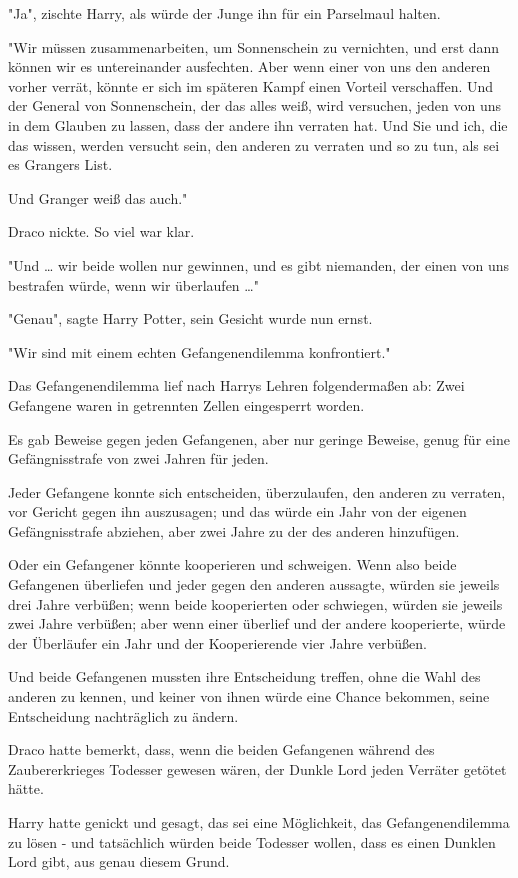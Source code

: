 {"Ja", zischte Harry, als würde der Junge ihn für ein Parselmaul halten.

"Wir müssen zusammenarbeiten, um Sonnenschein zu vernichten, und erst dann können wir es untereinander ausfechten. Aber wenn einer von uns den anderen vorher verrät, könnte er sich im späteren Kampf einen Vorteil verschaffen. Und der General von Sonnenschein, der das alles weiß, wird versuchen, jeden von uns in dem Glauben zu lassen, dass der andere ihn verraten hat. Und Sie und ich, die das wissen, werden versucht sein, den anderen zu verraten und so zu tun, als sei es Grangers List.

Und Granger weiß das auch."

Draco nickte. So viel war klar.

"Und … wir beide wollen nur gewinnen, und es gibt niemanden, der einen von uns bestrafen würde, wenn wir überlaufen …"

"Genau", sagte Harry Potter, sein Gesicht wurde nun ernst.

"Wir sind mit einem echten Gefangenendilemma konfrontiert."

Das Gefangenendilemma lief nach Harrys Lehren folgendermaßen ab: Zwei Gefangene waren in getrennten Zellen eingesperrt worden.

Es gab Beweise gegen jeden Gefangenen, aber nur geringe Beweise, genug für eine Gefängnisstrafe von zwei Jahren für jeden.

Jeder Gefangene konnte sich entscheiden, überzulaufen, den anderen zu verraten, vor Gericht gegen ihn auszusagen; und das würde ein Jahr von der eigenen Gefängnisstrafe abziehen, aber zwei Jahre zu der des anderen hinzufügen.

Oder ein Gefangener könnte kooperieren und schweigen. Wenn also beide Gefangenen überliefen und jeder gegen den anderen aussagte, würden sie jeweils drei Jahre verbüßen; wenn beide kooperierten oder schwiegen, würden sie jeweils zwei Jahre verbüßen; aber wenn einer überlief und der andere kooperierte, würde der Überläufer ein Jahr und der Kooperierende vier Jahre verbüßen.

Und beide Gefangenen mussten ihre Entscheidung treffen, ohne die Wahl des anderen zu kennen, und keiner von ihnen würde eine Chance bekommen, seine Entscheidung nachträglich zu ändern.

Draco hatte bemerkt, dass, wenn die beiden Gefangenen während des Zaubererkrieges Todesser gewesen wären, der Dunkle Lord jeden Verräter getötet hätte.

Harry hatte genickt und gesagt, das sei eine Möglichkeit, das Gefangenendilemma zu lösen - und tatsächlich würden beide Todesser wollen, dass es einen Dunklen Lord gibt, aus genau diesem Grund.

}
